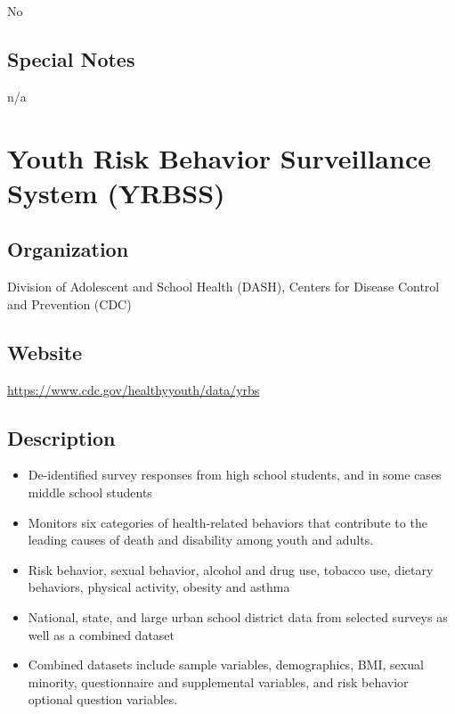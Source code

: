 \documentclass[
]{book}
\providecommand{\tightlist}{%
  \setlength{\itemsep}{0pt}\setlength{\parskip}{0pt}}
\begin{document}
No

\hypertarget{special-notes-97}{%
\section{Special Notes}\label{special-notes-97}}

n/a

\mainmatter

\hypertarget{youth-risk-behavior-surveillance-system-yrbss}{%
\chapter{Youth Risk Behavior Surveillance System (YRBSS)}\label{youth-risk-behavior-surveillance-system-yrbss}}

\hypertarget{organization-98}{%
\section{Organization}\label{organization-98}}

Division of Adolescent and School Health (DASH), Centers for Disease Control and Prevention (CDC)

\hypertarget{website-98}{%
\section{Website}\label{website-98}}

\url{https://www.cdc.gov/healthyyouth/data/yrbs}

\hypertarget{description-98}{%
\section{Description}\label{description-98}}

\begin{itemize}
\tightlist
\item
  De-identified survey responses from high school students, and in some cases middle school students
\item
  Monitors six categories of health-related behaviors that contribute to the leading causes of death and disability among youth and adults.
\item
  Risk behavior, sexual behavior, alcohol and drug use, tobacco use, dietary behaviors, physical activity, obesity and asthma
\item
  National, state, and large urban school district data from selected surveys as well as a combined dataset
\item
  Combined datasets include sample variables, demographics, BMI, sexual minority, questionnaire and supplemental variables, and risk behavior optional question variables.
\end{itemize}
\end{document}
